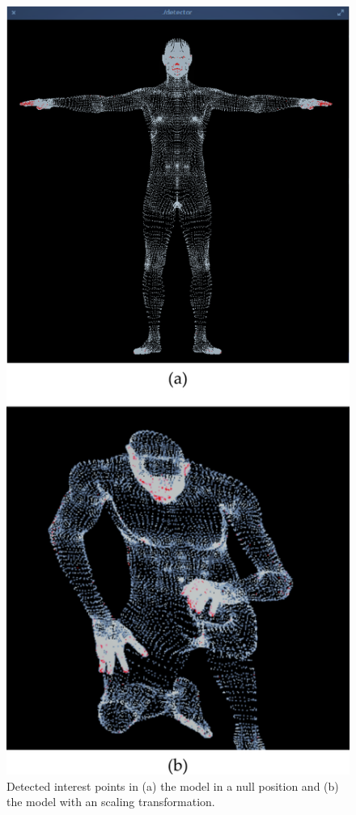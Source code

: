 \documentclass{comjnl}
\begin{document}
\begin{figure}
\centering
\includegraphics[width=0.9\linewidth]{figures/experiment_meshes.pdf}
\caption{Detected interest points in (a) the model in a null position and (b)
the model with an scaling transformation.}
\label{fig:result_meshes}
\end{figure}
\end{document}
